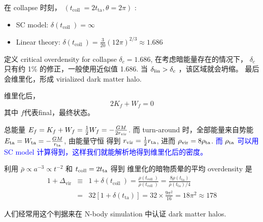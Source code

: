 \documentclass[12pt]{ctexart}
\newcommand{\new}[1]{\textcolor{blue}{#1}}
\begin{document}
在 collapse 时刻，
$\left(t_{\text {coll }}=2 t_{\mathrm{ta}}  , \theta=2\pi\right)$ :
\begin{itemize}
    \item SC model: $\delta\left(t_{\text {coll }}\right)=\infty$
    \item Linear theory: $\delta\left(t_{\text {coll }}\right)=\frac{3}{20}(12 \pi)^{2 / 3} \approx 1.686$
\end{itemize}



定义 critical overdensity for collapse $\delta_c = 1.686$, 在考虑暗能量存在的情况下， $\delta_c$ 只有约 1\% 的修正，一般使用近似值 1.686.
当 $\delta_{\rm{lin}} > \delta_c$ ，该区域就会坍缩。
最后会维里化，形成 virialized dark matter halo.



维里化后， 
\begin{equation}
    2K_f + W_f = 0
\end{equation}
其中 $f$代表final，最终状态。

总能量 $E_f = K_f + W_f = \frac{1}{2} W_f = -\frac{GM}{2 r _{\rm{vir}} }$.
而 turn-around 时，全部能量来自势能 $E _{\rm{ta}} = W _{\rm{ta}} =-\frac{GM}{r _{\rm{ta}} }$,
由能量守恒 得到 $r _{\rm{vir}} =\frac{1}{2} r _{\rm{ta}} $,
进而
$\rho _{\rm{vir}} = 8 \rho _{\rm{ta}} $. 
\new{而 $\rho _{\rm{ta}} $ 可以用 SC model 计算得到，这样我们就能解析地得到维里化后的密度。}

利用 $\bar{\rho} \propto a^{-3} \propto t^{-2}$ 和
$t _{\rm{coll}} = 2 t _{\rm{ta}} $
得到
维里化的暗物质晕的平均 overdensity 是
\begin{eqnarray}
        1+\Delta_{\mathrm{vir}} &\equiv& 1+\delta\left(t_{\text {coll }}\right)=\frac{\rho\left(t_{\text {coll }}\right)}{\bar{\rho}\left(t_{\text {coll }}\right)}=  \frac{8 \rho\left(t_{\mathrm{ta}}\right)}{\bar{\rho}\left(t_{\mathrm{ta}}\right) / 4} \\ 
        &=& 32\left[1+\delta\left(t_{\mathrm{ta}}\right)\right]=32 \times \frac{9 \pi^{2}}{16} = 18\pi^2 \approx 178
\end{eqnarray}

人们经常用这个判据来在 N-body simulation 中认证 dark matter halos.
\end{document}
